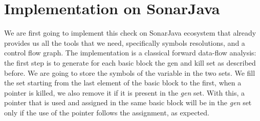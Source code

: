 \section{Implementation on SonarJava}
\label{sec:implementation_java}

We are first going to implement this check on SonarJava ecosystem that already provides us all the tools that we need, specifically symbols resolutions, and a control flow graph.
The implementation is a classical forward data-flow analysis: the first step is to generate for each basic block the gen and kill set as described before. 
We are going to store the symbols of the variable in the two sets. 
We fill the set starting from the last element of the basic block to the first, when a pointer is killed, we also remove it if it is present in the \emph{gen} set.
With this, a pointer that is used and assigned in the same basic block will be in the \emph{gen} set only if the use of the pointer follows the assignment, as expected.

 


